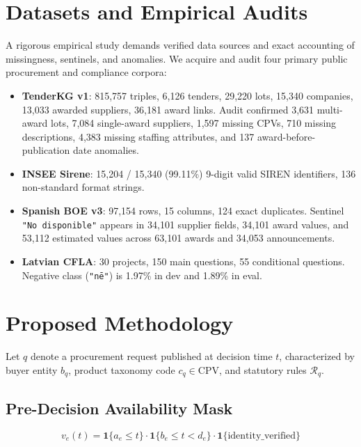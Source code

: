 \documentclass[journal,10pt,onecolumn,draftclsnofoot]{IEEEtran}
\begin{document}
\section{Datasets and Empirical Audits}
A rigorous empirical study demands verified data sources and exact accounting of missingness, sentinels, and anomalies. We acquire and audit four primary public procurement and compliance corpora:
\begin{itemize}
    \item \textbf{TenderKG v1}: 815,757 triples, 6,126 tenders, 29,220 lots, 15,340 companies, 13,033 awarded suppliers, 36,181 award links. Audit confirmed 3,631 multi-award lots, 7,084 single-award suppliers, 1,597 missing CPVs, 710 missing descriptions, 4,383 missing staffing attributes, and 137 award-before-publication date anomalies.
    \item \textbf{INSEE Sirene}: 15,204 / 15,340 (99.11\%) 9-digit valid SIREN identifiers, 136 non-standard format strings.
    \item \textbf{Spanish BOE v3}: 97,154 rows, 15 columns, 124 exact duplicates. Sentinel \texttt{"No disponible"} appears in 34,101 supplier fields, 34,101 award values, and 53,112 estimated values across 63,101 awards and 34,053 announcements.
    \item \textbf{Latvian CFLA}: 30 projects, 150 main questions, 55 conditional questions. Negative class (\texttt{"n\=e"}) is 1.97\% in dev and 1.89\% in eval.
\end{itemize}

\section{Proposed Methodology}
Let $q$ denote a procurement request published at decision time $t$, characterized by buyer entity $b_q$, product taxonomy code $c_q \in \text{CPV}$, and statutory rules $\mathcal{R}_q$.

\subsection{Pre-Decision Availability Mask}
\begin{equation}
v_e(t) = \mathbf{1}\{a_e \le t\} \cdot \mathbf{1}\{b_e \le t < d_e\} \cdot \mathbf{1}\{\text{identity\_verified}\}
\end{equation}
\end{document}
